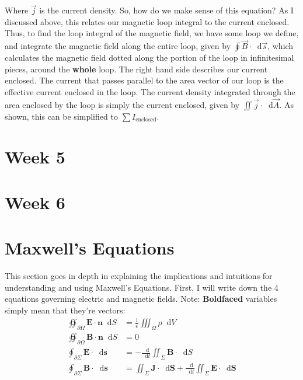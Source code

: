 \documentclass{article}
\newcommand*\VF[1]{\mathbf{#1}}
\newcommand*\dif{\mathop{}\!\mathrm{d}}
\begin{document}
Where $\vec{j}$ is the current density. So, how do we make sense of this equation? As I discussed above, this relates our magnetic loop integral to the current enclosed. Thus, to find the loop integral of the magnetic field, we have some loop we define, and integrate the magnetic field along the entire loop, given by $\oint \vec{B} \cdot \dif \vec{s}$, which calculates the magnetic field dotted along the portion of the loop in infinitesimal pieces, around the \textbf{whole} loop. The right hand side describes our current enclosed. The current that passes parallel to the area vector of our loop is the effective current enclosed in the loop. The current density integrated through the area enclosed by the loop is simply the current enclosed, given by $\iint \vec{j} \cdot \dif \vec{A}$. As shown, this can be simplified to $\sum\limits I_{\text{enclosed}}$. 

\pagebreak

\section{Week 5}

\pagebreak

\section{Week 6}

\pagebreak

\section{Maxwell's Equations}
This section goes in depth in explaining the implications and intuitions for understanding and using Maxwell's Equations. First, I will write down the 4 equations governing electric and magnetic fields. Note: \textbf{Boldfaced} variables simply mean that they're vectors:
\begin{align*}
    \oiint_{\partial \Omega} \VF{E} \cdot \VF{n} \dif S
    &= \frac{1}{\epsilon}\iiint_{\Omega} \rho \dif V\\
    \oiint_{\partial \Omega} \VF{B} \cdot \VF{n} \dif S
    &= 0\\
    \oint_{\partial \Sigma} \VF{E} \cdot \dif \VF{s}
    &= -\frac{\dif}{\dif t}\iint_\Sigma \VF{B} \cdot \dif S\\
    \oint_{\partial \Sigma} \VF{B} \cdot \dif \VF{s}
    &= \iint_\Sigma \VF{J} \cdot \dif \VF{S} + \frac{\dif}{\dif t}\iint_\Sigma \VF{E} \cdot \dif \VF{S}
\end{align*}\\
\end{document}
